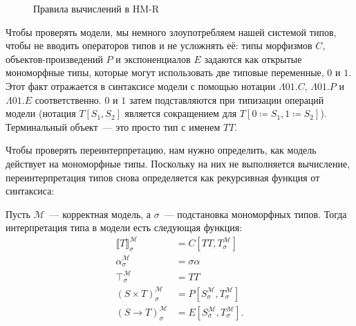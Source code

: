 \begin{figure}
    \centering
    \caption{Правила вычислений в HM-R}
    \label{hm-r-comp}
\end{figure}

Чтобы проверять модели, мы немного злоупотребляем нашей
системой типов, чтобы не вводить операторов типов и не
усложнять её: типы морфизмов $C$, объектов-произведений
$P$ и экспоненциалов $E$ задаются как открытые
мономорфные типы, которые могут использовать две
типовые переменные, $0$ и $1$. Этот факт отражается в
синтаксисе модели с помощью нотации $\Lambda 01.C$,
$\Lambda 01.P$ и $\Lambda 01.E$ соответственно. $0$ и
$1$ затем подставляются при типизации операций модели
(нотация $T[S_1, S_2]$ является сокращением для
$T[0\coloneqq S_1,1\coloneqq S_2]$). Терминальный
объект~--- это просто тип с именем $TT$.

Чтобы проверять переинтерпретацию, нам нужно
определить, как модель действует на мономорфные типы.
Поскольку на них не выполняется вычисление,
переинтерпретация типов снова определяется как
рекурсивная функция от синтаксиса:

\begin{definition}
    Пусть $\mathcal{M}$~--- корректная модель, а
    $\sigma$~--- подстановка мономорфных типов. Тогда
    интерпретация типа в модели есть следующая функция:
    \begin{align}{}
        \llbracket T\rrbracket^\mathcal{M}_\sigma &=
        C[TT,T^\mathcal{M}_\sigma] \\
        \alpha^\mathcal{M}_\sigma &= \sigma\alpha \\
        \top^\mathcal{M}_\sigma &= TT \\
        (S\times T)^\mathcal{M}_\sigma &=
        P[S^\mathcal{M}_\sigma,T^\mathcal{M}_\sigma] \\
        (S\to T)^\mathcal{M}_\sigma &=
        E[S^\mathcal{M}_\sigma,T^\mathcal{M}_\sigma].
    \end{align}
\end{definition}

